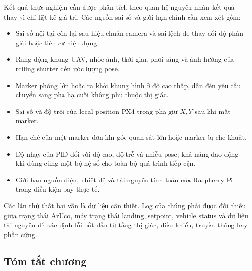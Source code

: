 Kết quả thực nghiệm cần được phân tích theo quan hệ nguyên nhân--kết quả thay vì chỉ liệt kê giá trị. Các nguồn sai số và giới hạn chính cần xem xét gồm:
\begin{itemize}
    \item Sai số nội tại còn lại sau hiệu chuẩn camera và sai lệch do thay đổi độ phân giải hoặc tiêu cự hiệu dụng.
    \item Rung động khung UAV, nhòe ảnh, thời gian phơi sáng và ảnh hưởng của rolling shutter đến ước lượng pose.
    \item Marker phóng lớn hoặc ra khỏi khung hình ở độ cao thấp, dẫn đến yêu cầu chuyển sang pha hạ cuối không phụ thuộc thị giác.
    \item Sai số và độ trôi của local position PX4 trong pha giữ $X,Y$ sau khi mất marker.
    \item Hạn chế của một marker đơn khi góc quan sát lớn hoặc marker bị che khuất.
    \item Độ nhạy của PID đối với độ cao, độ trễ và nhiễu pose; khả năng dao động khi dùng cùng một bộ hệ số cho toàn bộ quá trình tiếp cận.
    \item Giới hạn nguồn điện, nhiệt độ và tài nguyên tính toán của Raspberry Pi trong điều kiện bay thực tế.
\end{itemize}

Các lần thử thất bại vẫn là dữ liệu cần thiết. Log của chúng phải được đối chiếu giữa trạng thái ArUco, máy trạng thái landing, setpoint, vehicle status và dữ liệu tài nguyên để xác định lỗi bắt đầu từ tầng thị giác, điều khiển, truyền thông hay phần cứng.

\subsection{Tóm tắt chương}

